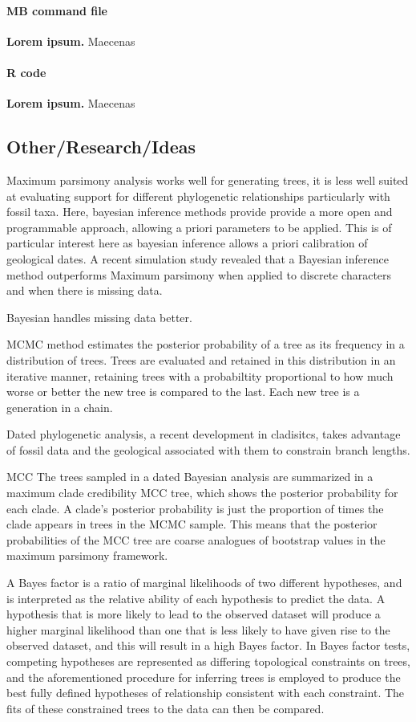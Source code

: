 \documentclass[11pt,letterpaper]{article}
\begin{document}
\paragraph*{MB command file}
\label{S1_Video}
{\bf Lorem ipsum.}  Maecenas 

\paragraph*{R code}
\label{S1_Appendix}
{\bf Lorem ipsum.} Maecenas 

\newpage

\subsection{Other/Research/Ideas}


Maximum parsimony analysis works well for generating trees, it is less well suited at evaluating support for different phylogenetic relationships particularly with fossil taxa. Here, bayesian inference methods provide provide a more open and programmable approach, allowing a priori parameters to be applied. This is of particular interest here as bayesian inference allows a priori calibration of geological dates. A recent simulation study revealed that a Bayesian inference method outperforms Maximum parsimony when applied to discrete characters and when there is missing data.

Bayesian handles missing data better.

MCMC method estimates the posterior probability of a tree as its frequency in a distribution of trees. Trees are evaluated and retained in this distribution in an iterative manner, retaining trees with a probabiltity proportional to how much worse or better the new tree is compared to the last. Each new tree is a generation in a chain.

Dated phylogenetic analysis, a recent development in cladisitcs, takes advantage of fossil data and the geological associated with them to constrain branch lengths.   

MCC The trees sampled in a dated Bayesian analysis are summarized in a maximum clade credibility MCC tree, which shows the posterior probability for each clade. A clade's posterior probability is just the proportion of times the clade appears in trees in the MCMC sample. This means that the posterior probabilities of the MCC tree are coarse analogues of bootstrap values in the maximum parsimony framework.

A Bayes factor is a ratio of marginal likelihoods of two different hypotheses, and is interpreted as the relative ability of each hypothesis to predict the data. A hypothesis that is more likely to lead to the observed dataset will produce a higher marginal likelihood than one that is less likely to have given rise to the observed dataset, and this will result in a high Bayes factor. In Bayes factor tests, competing hypotheses are represented as differing topological constraints on trees, and the aforementioned procedure for inferring trees is employed to produce the best fully defined hypotheses of relationship consistent with each constraint. The fits of these constrained trees to the data can then be compared.
\end{document}
